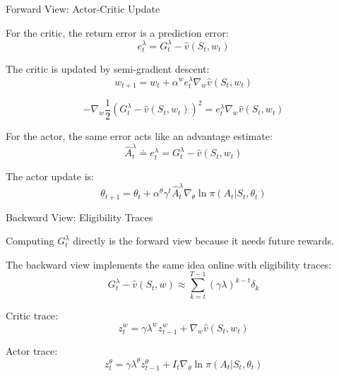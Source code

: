 \documentclass{beamer}
\begin{document}
\begin{frame}{Forward View: Actor-Critic Update}

\scriptsize

For the critic, the return error is a prediction error:
\[
e_t^\lambda
=
G_t^\lambda
-
\hat{v}(S_t,w_t)
\]

\vspace{0.05cm}

The critic is updated by semi-gradient descent:
\[
w_{t+1}
=
w_t
+
\alpha^w e_t^\lambda
\nabla_w \hat{v}(S_t,w_t)
\]

\[
-\nabla_w
\frac{1}{2}
\left(G_t^\lambda-\hat{v}(S_t,w_t)\right)^2
=
e_t^\lambda \nabla_w \hat{v}(S_t,w_t)
\]

\vspace{0.05cm}

For the actor, the same error acts like an advantage estimate:
\[
\widehat{A}_t^\lambda
\doteq
e_t^\lambda
=
G_t^\lambda
-
\hat{v}(S_t,w_t)
\]

The actor update is:
\[
\theta_{t+1}
=
\theta_t
+
\alpha^\theta \gamma^t
\widehat{A}_t^\lambda
\nabla_\theta \ln \pi(A_t|S_t,\theta_t)
\]

\end{frame}

\begin{frame}{Backward View: Eligibility Traces}

\small

Computing \(G_t^\lambda\) directly is the forward view because it needs
future rewards.

\vspace{0.1cm}

The backward view implements the same idea online with eligibility traces:
\[
G_t^\lambda - \hat{v}(S_t,w)
\approx
\sum_{k=t}^{T-1}
(\gamma\lambda)^{k-t}
\delta_k
\]

\vspace{0.1cm}

Critic trace:
\[
z_t^w
=
\gamma \lambda^w z_{t-1}^w
+
\nabla_w \hat{v}(S_t,w_t)
\]

Actor trace:
\[
z_t^\theta
=
\gamma \lambda^\theta z_{t-1}^\theta
+
I_t \nabla_\theta \ln \pi(A_t|S_t,\theta_t)
\]

\end{frame}
\end{document}
